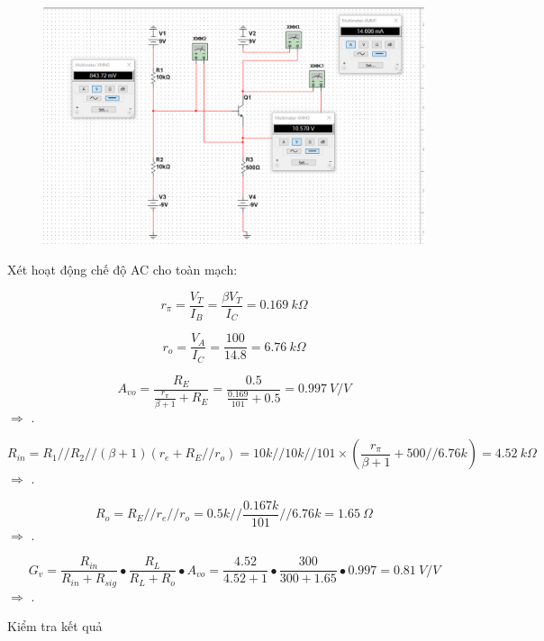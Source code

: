 \begin{itemize}[label=-]
	\begin{figure}[H]
		\centering
		\includegraphics[width=\linewidth]{./my-chapters/my-images/Question3/a_ketqua.png}
	\end{figure}
\end{itemize}


Xét hoạt động chế độ AC cho toàn mạch:

\[
r_\pi = \frac{V_T}{I_B} = \frac{\beta V_T}{I_C} = 0.169\ k\Omega
\]

\[
r_o = \frac{V_A}{I_C} = \frac{100}{14.8} = 6.76\ k\Omega
\]

\[
A_{vo} = \frac{R_E}{\frac{r_\pi}{\beta + 1} + R_E} 
= \frac{0.5}{\frac{0.169}{101} + 0.5} 
= 0.997\ V/V
\]
$\Rightarrow$ .

\[
R_{in} = R_1 // R_2 // (\beta + 1)\left(r_e + R_E // r_o\right) = 10k // 10k // 101 \times \left(\frac{r_\pi}{\beta + 1} + 500 // 6.76k\right)
= 4.52\ k\Omega
\]
$\Rightarrow$ .

\[
R_o = R_E // r_e // r_o 
= 0.5k // \frac{0.167k}{101} // 6.76k 
= 1.65\ \Omega
\]
$\Rightarrow$ .

\[
G_v = \frac{R_{in}}{R_{in} + R_{sig}} \bullet 
\frac{R_L}{R_L + R_o} \bullet A_{vo} 
= \frac{4.52}{4.52 + 1} \bullet 
\frac{300}{300 + 1.65} \bullet 0.997 
= 0.81\ V/V
\]
$\Rightarrow$ .

Kiểm tra kết quả

